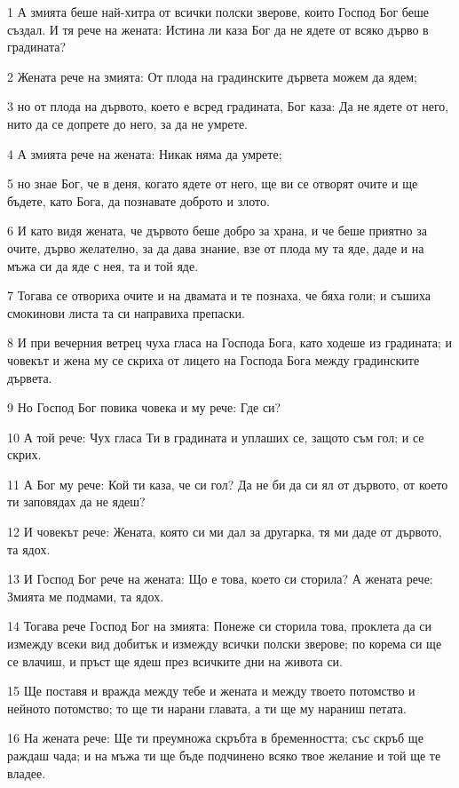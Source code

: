 \par 1 А змията беше най-хитра от всички полски зверове, които Господ Бог беше създал. И тя рече на жената: Истина ли каза Бог да не ядете от всяко дърво в градината?
\par 2 Жената рече на змията: От плода на градинските дървета можем да ядем;
\par 3 но от плода на дървото, което е всред градината, Бог каза: Да не ядете от него, нито да се допрете до него, за да не умрете.
\par 4 А змията рече на жената: Никак няма да умрете;
\par 5 но знае Бог, че в деня, когато ядете от него, ще ви се отворят очите и ще бъдете, като Бога, да познавате доброто и злото.
\par 6 И като видя жената, че дървото беше добро за храна, и че беше приятно за очите, дърво желателно, за да дава знание, взе от плода му та яде, даде и на мъжа си да яде с нея, та и той яде.
\par 7 Тогава се отвориха очите и на двамата и те познаха, че бяха голи; и съшиха смокинови листа та си направиха препаски.
\par 8 И при вечерния ветрец чуха гласа на Господа Бога, като ходеше из градината; и човекът и жена му се скриха от лицето на Господа Бога между градинските дървета.
\par 9 Но Господ Бог повика човека и му рече: Где си?
\par 10 А той рече: Чух гласа Ти в градината и уплаших се, защото съм гол; и се скрих.
\par 11 А Бог му рече: Кой ти каза, че си гол? Да не би да си ял от дървото, от което ти заповядах да не ядеш?
\par 12 И човекът рече: Жената, която си ми дал за другарка, тя ми даде от дървото, та ядох.
\par 13 И Господ Бог рече на жената: Що е това, което си сторила? А жената рече: Змията ме подмами, та ядох.
\par 14 Тогава рече Господ Бог на змията: Понеже си сторила това, проклета да си измежду всеки вид добитък и измежду всички полски зверове; по корема си ще се влачиш, и пръст ще ядеш през всичките дни на живота си.
\par 15 Ще поставя и вражда между тебе и жената и между твоето потомство и нейното потомство; то ще ти нарани главата, а ти ще му нараниш петата.
\par 16 На жената рече: Ще ти преумножа скръбта в бременността; със скръб ще раждаш чада; и на мъжа ти ще бъде подчинено всяко твое желание и той ще те владее.
